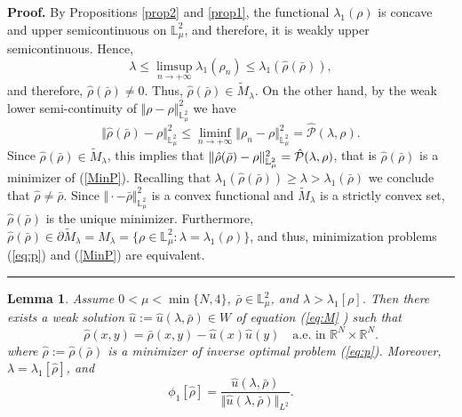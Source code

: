 \documentclass[12pt,thmsa]{article}
\newtheorem{lemma}[theorem]{Lemma}
\newenvironment{proof}[1][Proof]{\noindent\textbf{#1.} }{\ \rule{0.5em}{0.5em}}
\begin{document}
\begin{proof}
By Propositions \ref{prop2} and \ref{prop1}, the functional $\lambda
_{1}(\rho )$ is concave and upper semicontinuous on $\mathbb{L}_{\mu }^{2}$,
and therefore, it is weakly upper semicontinuous. Hence,
\begin{equation*}
\lambda \leq \limsup_{n\rightarrow +\infty }\lambda _{1}(\rho _{n})\leq
\lambda _{1}(\hat{\rho}(\bar{\rho})),
\end{equation*}%
and therefore, $\hat{\rho}(\bar{\rho})\neq 0$. Thus, $\hat{\rho}(\bar{\rho}%
)\in \tilde{M}_{\lambda }$. On the other hand, by the weak lower
semi-continuity of $\Vert \rho -\rho \Vert _{\mathbb{L}_{\mu }^{2}}^{2}$ we
have
\begin{equation*}
\Vert \hat{\rho}(\bar{\rho})-\rho \Vert _{\mathbb{L}_{\mu }^{2}}^{2}\leq
\liminf_{n\rightarrow +\infty }\Vert \rho _{n}-\rho \Vert _{\mathbb{L}_{\mu
}^{2}}^{2}=\hat{\mathcal{P}}(\lambda ,\rho ).
\end{equation*}%
Since $\hat{\rho}(\bar{\rho})\in \tilde{M}_{\lambda }$, this implies that $%
\Vert \hat{\rho}(\bar{\rho})-\rho \Vert _{\mathbb{L}_{\mu }^{2}}^{2}=\hat{%
\mathcal{P}}(\lambda ,\rho )$, that is $\hat{\rho}(\bar{\rho})$ is a
minimizer of (\ref{MinP}). Recalling that $\lambda _{1}(\hat{\rho}(\bar{\rho}%
))\geq \lambda >\lambda _{1}(\bar{\rho})$ we conclude that $\hat{\rho}\neq
\bar{\rho}$. Since $\Vert \cdot -\bar{\rho}\Vert _{\mathbb{L}_{\mu
}^{2}}^{2} $ is a convex functional and $\tilde{M}_{\lambda }$ is a strictly
convex set, $\hat{\rho}(\bar{\rho})$ is the unique minimizer. Furthermore, $%
\hat{\rho}(\bar{\rho})\in \partial \tilde{M}_{\lambda }=M_{\lambda }=\{\rho
\in \mathbb{L}_{\mu }^{2}:\lambda =\lambda _{1}(\rho )\}$, and thus,
minimization problems (\ref{eq:p}) and (\ref{MinP}) are equivalent.
\end{proof}

\begin{lemma}
\label{lem2} Assume $0<\mu <\min \{N,4\}$, $\bar{\rho}\in \mathbb{L}_{\mu
}^{2}$, and $\lambda >\lambda _{1}[\rho ]$. Then there exists a weak
solution $\hat{u}:=\hat{u}(\lambda ,\bar{\rho})\in W$ of equation (\ref{eq:M}%
) such that
\begin{equation*}
\hat{\rho}(x,y)=\bar{\rho}(x,y)-\hat{u}(x)\hat{u}(y)\quad \text{a.e. in }%
\mathbb{R}^{N}\times \mathbb{R}^{N}.
\end{equation*}%
where $\hat{\rho}:=\hat{\rho}(\bar{\rho})$ is a minimizer of inverse optimal
problem (\ref{eq:p}). Moreover, $\lambda =\lambda _{1}[\hat{\rho}]$, and
\begin{equation*}
\phi _{1}[\hat{\rho}]=\frac{\hat{u}(\lambda ,\bar{\rho})}{\Vert \hat{u}%
(\lambda ,\bar{\rho})\Vert _{L^{2}}}.
\end{equation*}
\end{lemma}
\end{document}
